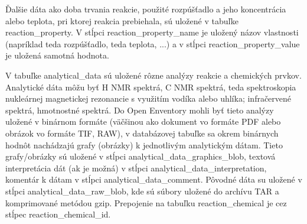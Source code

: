 \documentclass[thesis=M,slovak]{FITthesis}[2013/05/06]
\begin{document}
Ďalšie dáta ako doba trvania reakcie, použité rozpúšťadlo a jeho koncentrácia alebo teplota, pri ktorej reakcia prebiehala, sú uložené v tabuľke reaction\_property. V stĺpci reaction\_property\_name je uložený názov vlastnosti (napríklad  teda rozpúšťadlo,  teda teplota, ...) a v stĺpci reaction\_property\_value je uložená samotná hodnota.

V tabuľke analytical\_data sú uložené rôzne analýzy reakcie a chemických prvkov. Analytické dáta môžu byť H NMR spektrá, C NMR spektrá, teda spektroskopia nukleárnej magnetickej rezonancie s využitím vodíka alebo uhlíka; infračervené spektrá, hmotnostné spektrá. Do Open Enventory mohli byť tieto analýzy uložené v binárnom formáte (väčšinou ako dokument vo formáte PDF alebo obrázok vo formáte TIF, RAW), v databázovej tabuľke sa okrem binárnych hodnôt nachádzajú grafy (obrázky) k jednotlivým analytickým dátam. Tieto grafy/obrázky sú uložené v stĺpci  analytical\_data\_graphics\_blob, textová interpretácia dát (ak je možná) v stĺpci analytical\_data\_interpretation, komentár k dátam v stĺpci analytical\_data\_comment. Pôvodné dáta su uložené v stĺpci analytical\_data\_raw\_blob, kde sú súbory uložené do archívu TAR a komprimované metódou gzip. Prepojenie na tabuľku reaction\_chemical je cez stĺpec reaction\_chemical\_id.

%
\end{document}
